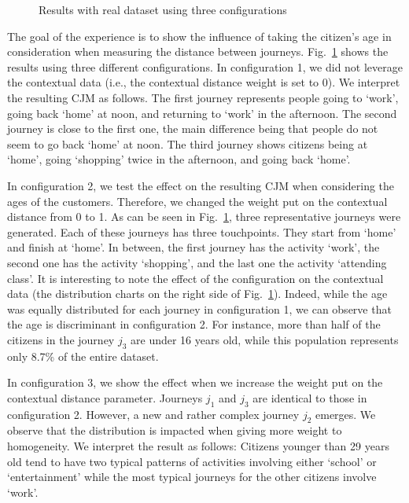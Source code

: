 \documentclass[runningheads]{llncs}
\begin{document}
{{{\begin{figure}[H]
\begin{center}
  \end{center}
  \caption{Results with real dataset using three configurations}
  \label{fig:results_real_dataset}
\end{figure}

The goal of the experience is to show the influence of taking the citizen's age in consideration when measuring the distance between journeys. Fig.~\ref{fig:results_real_dataset} shows the results using three different configurations. In configuration 1, we did not leverage the contextual data (i.e., the contextual distance weight is set to 0). We interpret the resulting  CJM as follows. The first journey represents people going to `work', going back `home' at noon, and returning to `work' in the afternoon. The second journey is close to the first one, the main difference being that people do not seem to go back `home' at noon. The third journey shows citizens being at `home', going `shopping' twice in the afternoon, and going back `home'. 

In configuration 2, we test the effect on the resulting CJM when considering the ages of the customers. Therefore, we changed the weight put on the contextual distance from 0 to 1. As can be seen in Fig.~\ref{fig:results_real_dataset}, three representative journeys were generated. Each of these journeys has three touchpoints. They start from `home' and finish at `home'. In between, the first journey has the activity `work', the second one has the activity `shopping', and the last one the activity `attending class'. It is interesting to note the effect of the configuration on the contextual data (the distribution charts on the right side of Fig.~\ref{fig:results_real_dataset}). Indeed, while the age was equally distributed for each journey in configuration 1, we can observe that the age is discriminant in configuration 2. For instance, more than half of the citizens in the journey $j_3$ are under 16 years old, while this population represents only 8.7\% of the entire dataset.

In configuration 3, we show the effect when we increase the weight put on the contextual distance parameter. Journeys $j_1$ and $j_3$ are identical to those in configuration 2. However, a new and rather complex journey $j_2$ emerges. We observe that the distribution is impacted when giving more weight to homogeneity. We interpret the result as follows: Citizens younger than 29 years old tend to have two typical patterns of activities involving either `school' or `entertainment' while the most typical journeys for the other citizens involve `work'. 

}}}
\end{document}
